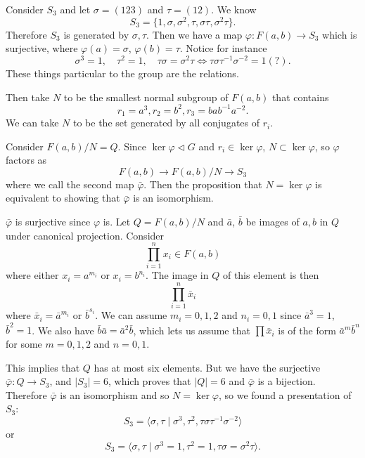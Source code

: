 \begin{xmpl}
Consider $S_3$ and let $\sigma = (123)$ and $\tau = (12)$. We know
$$
S_3 = \{ 1, \sigma, \sigma^2, \tau, \sigma \tau, \sigma^2 \tau \}.
$$
Therefore $S_3$ is generated by $\sigma, \tau$. Then we have a map
$\varphi : F(a, b) \to S_3$ which is surjective, where
$\varphi(a) = \sigma$, $\varphi(b) = \tau$. Notice for instance
$$
\sigma^3 = 1, \quad
\tau^2 = 1, \quad
\tau \sigma = \sigma^2 \tau  \iff \tau \sigma \tau^{-1} \sigma^{-2} =
1 (?).
$$
These things particular to the group are the relations.

Then take $N$ to be the smallest normal subgroup of $F(a,b)$ that
contains
$$
r_1 = a^3, r_2 = b^2, r_3 = b a b^{-1} a^{-2}.
$$
We can take $N$ to be the set generated by all conjugates of $r_i$.

Consider $F(a,b) / N = Q$. Since $\ker \varphi \triangleleft G$ and
$r_i \in \ker \varphi$, $N \subset \ker \varphi$, so $\varphi$ factors
as
$$
F(a, b) \to F(a, b) / N \to S_3
$$
where we call the second map $\bar{\varphi}$. Then the proposition
that $N = \ker \varphi$ is equivalent to showing that $\bar{\varphi}$
is an isomorphism.

$\bar{\varphi}$ is surjective since $\varphi$ is. Let
$Q = F(a,b) / N$ and $\bar{a}$, $\bar{b}$ be images of $a, b$ in $Q$
under canonical projection. Consider
$$
\prod_{i=1}^n x_i \in F(a,b)
$$
where either $x_i = a^{m_i}$ or $x_i = b^{n_i}$. The image in $Q$ of
this element is then
$$
\prod_{i=1}^n \bar{x}_i
$$
where $\bar{x}_i = \bar{a}^{m_i}$ or $\bar{b}^{s_i}$. We can assume
$m_i = 0, 1, 2$ and $n_i = 0, 1$ since $\bar{a}^3 = 1$, $\bar{b}^2 =
1$. We also have $\bar{b} \bar{a} = \bar{a}^2 \bar{b}$, which lets us
assume that $\prod \bar{x}_i$ is of the form $\bar{a}^m \bar{b}^n$ for
some $m = 0, 1, 2$ and $n = 0, 1$.

This implies that $Q$ has at most six elements. But we have the
surjective $\bar{\varphi} : Q \to S_3$, and $|S_3| =
6$, which proves that $|Q| = 6$ and $\bar{\varphi}$ is a
bijection. Therefore $\bar{\varphi}$ is an isomorphism and so
$N = \ker \varphi$, so we found a presentation of $S_3$:
$$
S_3 = \langle \sigma, \tau
        \mid \sigma^3, \tau^2, \tau \sigma \tau^{-1} \sigma^{-2}
      \rangle
$$
or
$$
S_3 = \langle \sigma, \tau
        \mid \sigma^3 = 1,
             \tau^2 = 1,
             \tau \sigma = \sigma^2 \tau
      \rangle.
$$
\end{xmpl}


